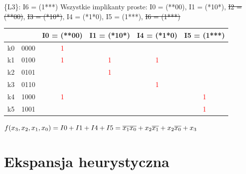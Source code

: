 \documentclass[]{article}
\begin{document}
\newline
\newline
\{L3\}: I6 = (1***)
\newline
\newline
Wszystkie implikanty proste:
\newline
\newline
I0 = (**00), I1 = (*10*), \sout{I2 = (**00)}, \sout{I3 = (*10*)}, I4 = (*1*0), I5 = (1***), \sout{I6 = (1***)}
\newline
\newline
\begin{tabular}[r]{|c|c|c|c|c|c|}

\hline
       &      & I0 = (**00) & I1 = (*10*) & I4 = (*1*0) & I5 = (1***)\\
\hline
    k0 & 0000 & \textcolor{red}{1} &   &   &  \\
    k1 & 0100 & \textcolor{red}{1} & \textcolor{red}{1} & \textcolor{red}{1} &  \\
    k2 & 0101 &   & \textcolor{red}{1} &   &  \\
    k3 & 0110 &   &   & \textcolor{red}{1} &  \\
    k4 & 1000 & \textcolor{red}{1} &   &   & \textcolor{red}{1}\\
    k5 & 1001 &   &   &   & \textcolor{red}{1}\\
 \hline 
\end{tabular}
\newline
\newline
$f(x\textsubscript{3},x\textsubscript{2},x\textsubscript{1},x\textsubscript{0}) = I0 + I1 + I4 + I5 = \overline{x_{1}}\overline{x_{0}} + x\textsubscript{2}\overline{x_{1}} + x\textsubscript{2}\overline{x_{0}} + x\textsubscript{3}$
\newpage
\section{Ekspansja heurystyczna}
\end{document}
